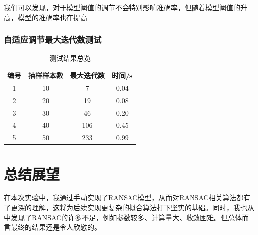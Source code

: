 \documentclass{seuer}
\begin{document}
我们可以发现，对于模型阈值的调节不会特别影响准确率，但随着模型阈值的升高，模型的准确率也在提高

\subsubsection{自适应调节最大迭代数测试}
\begin{table}[h]
  \centering
  \captionnamefont{\wuhao\bf\heiti}
  \captiontitlefont{\wuhao\bf\heiti}
  \caption{测试结果总览} \label{tab:eg1}
  \liuhao
  \begin{tabular}{cccc}
  \toprule
  {编号} & {抽样样本数} & {最大迭代数} & {时间/s} \\
  \midrule 
  1 & 10 & 7 & 0.04\\
  2 & 20 & 19 & 0.08\\
  3 & 30 & 46 & 0.20\\
  4 & 40 & 106 & 0.45\\
  5 & 50 & 233 & 0.99\\
  \bottomrule
  \end{tabular}
\end{table}

\section{总结展望}
在本次实验中，我通过手动实现了RANSAC模型，从而对RANSAC相关算法都有了更深的理解，这将为后续实现更复杂的拟合算法打下坚实的基础。同时，我也从中发现了RANSAC的许多不足，例如参数较多、计算量大、收敛困难。但总体而言最终的结果还是令人欣慰的。
\end{document}
